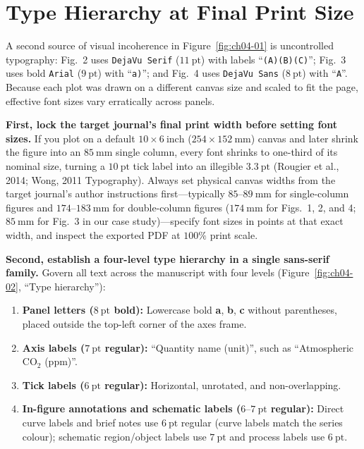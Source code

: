 \section{Type Hierarchy at Final Print Size}

A second source of visual incoherence in Figure~\ref{fig:ch04-01} is uncontrolled typography: Fig.\ 2 uses \texttt{DejaVu Serif} ($11\ \text{pt}$) with labels ``\texttt{(A)(B)(C)}''; Fig.\ 3 uses bold \texttt{Arial} ($9\ \text{pt}$) with ``\texttt{a)}''; and Fig.\ 4 uses \texttt{DejaVu Sans} ($8\ \text{pt}$) with ``\texttt{A}''. Because each plot was drawn on a different canvas size and scaled to fit the page, effective font sizes vary erratically across panels.

\textbf{First, lock the target journal's final print width before setting font sizes.} If you plot on a default $10 \times 6\ \text{inch}$ ($254 \times 152\ \text{mm}$) canvas and later shrink the figure into an $85\ \text{mm}$ single column, every font shrinks to one-third of its nominal size, turning a $10\ \text{pt}$ tick label into an illegible $3.3\ \text{pt}$ (Rougier et al., 2014; Wong, 2011 Typography). Always set physical canvas widths from the target journal's author instructions first---typically $85\text{--}89\ \text{mm}$ for single-column figures and $174\text{--}183\ \text{mm}$ for double-column figures ($174\ \text{mm}$ for Figs.\ 1, 2, and 4; $85\ \text{mm}$ for Fig.\ 3 in our case study)---specify font sizes in points at that exact width, and inspect the exported PDF at $100\%$ print scale.

\textbf{Second, establish a four-level type hierarchy in a single sans-serif family.} Govern all text across the manuscript with four levels (Figure~\ref{fig:ch04-02}, ``Type hierarchy''):
\begin{enumerate}
\item \textbf{Panel letters ($8\ \text{pt}$ bold):} Lowercase bold \textbf{a}, \textbf{b}, \textbf{c} without parentheses, placed outside the top-left corner of the axes frame.
\item \textbf{Axis labels ($7\ \text{pt}$ regular):} ``Quantity name (unit)'', such as ``Atmospheric $\text{CO}_2$ (ppm)''.
\item \textbf{Tick labels ($6\ \text{pt}$ regular):} Horizontal, unrotated, and non-overlapping.
\item \textbf{In-figure annotations and schematic labels ($6\text{--}7\ \text{pt}$ regular):} Direct curve labels and brief notes use $6\ \text{pt}$ regular (curve labels match the series colour); schematic region/object labels use $7\ \text{pt}$ and process labels use $6\ \text{pt}$.
\end{enumerate}

